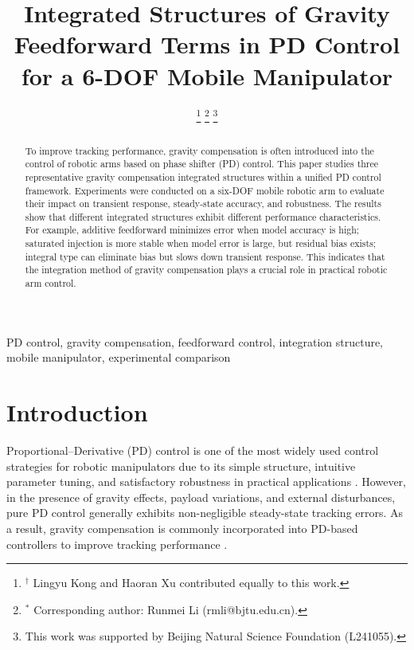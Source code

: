 \documentclass[conference]{IEEEtran}
\begin{document}
\title{Integrated Structures of Gravity Feedforward Terms in PD Control for a 6-DOF Mobile Manipulator}
\author{
	
	
	\thanks{$^{\dagger}$ Lingyu Kong and Haoran Xu contributed equally to this work.}
	\thanks{$^{*}$ Corresponding author: Runmei Li (rmli@bjtu.edu.cn).}
	\thanks{This work was supported by Beijing Natural Science Foundation (L241055).}
}

\maketitle

\begin{abstract}
To improve tracking performance, gravity compensation is often introduced into the control of robotic arms based on phase shifter (PD) control. This paper studies three representative gravity compensation integrated structures within a unified PD control framework. Experiments were conducted on a six-DOF mobile robotic arm to evaluate their impact on transient response, steady-state accuracy, and robustness. The results show that different integrated structures exhibit different performance characteristics. For example, additive feedforward minimizes error when model accuracy is high; saturated injection is more stable when model error is large, but residual bias exists; integral type can eliminate bias but slows down transient response. This indicates that the integration method of gravity compensation plays a crucial role in practical robotic arm control.
\end{abstract}

\begin{IEEEkeywords}
	PD control, gravity compensation, feedforward control, integration structure, mobile manipulator, experimental comparison
\end{IEEEkeywords}



\section{Introduction}

Proportional--Derivative (PD) control is one of the most widely used control strategies for robotic manipulators due to its simple structure, intuitive parameter tuning, and satisfactory robustness in practical applications \cite{b1,b2}. However, in the presence of gravity effects, payload variations, and external disturbances, pure PD control generally exhibits non-negligible steady-state tracking errors. As a result, gravity compensation is commonly incorporated into PD-based controllers to improve tracking performance \cite{b3,b4}.
\end{document}

